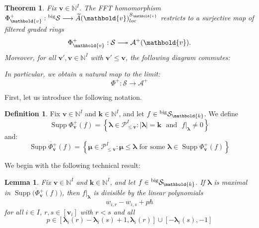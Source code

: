 \documentclass[11pt,reqno]{amsart}
\renewcommand{\mathbf}{\mathbold}
\numberwithin{equation}{section}
\newtheorem{Theorem}[equation]{Theorem}
\newtheorem{Lemma}[equation]{Lemma}
\theoremstyle{definition}
\newtheorem{Definition}[equation]{Definition}
\newcommand{\cA}{\mathcal{A}}
\newcommand{\cP}{\mathcal{P}}
\newcommand{\cS}{\mathcal{S}}
\newcommand{\bk}{\mathbf{k}}
\newcommand{\bv}{\mathbf{v}}
\newcommand{\NN}{\mathbb{N}}
\renewcommand{\tilde}[1]{\widetilde{#1}}
\newcommand{\leftexp}[2]{\vphantom{#2}^{#1} #2}
\newcommand{\twoheadlongrightarrow}{\relbar\joinrel\twoheadrightarrow}
\DeclareMathOperator{\supp}{Supp}
\newcommand{\suchthat}{:}
\newcommand{\textand}{\text{ }\mathrm{and}\text{ }}
\renewcommand{\bv}{\mathbf{v}} %
\newcommand{\vertexset}{I}
\newcommand{\bla}{{\boldsymbol{\lambda}}}
\newcommand{\bmu}{{\boldsymbol{\mu}}}
\newcommand{\qzastplus}{\cA^{+}}
\newcommand{\GKLO}[1]{\tilde{A}(#1)_{loc}}
\newcommand{\preshu}{\leftexp{\mathrm{big}}{\cS}}
\begin{document}
\begin{Theorem}
  \label{thm:regularity-of-phi-bv}
  Fix $\bv \in \NN^I$. The FFT homomorphism $\Phi^+_\bv: \preshu \longrightarrow \GKLO{\bv}^{S_{\bv}}$ restricts to a surjective map of filtered graded rings
  \begin{equation}
    \label{eq:11}
   \Phi^+_\bv: \cS \twoheadlongrightarrow \qzastplus(\bv).
  \end{equation}
  Moreover, for all $\bv', \bv \in \NN^I$ with $\bv' \leq \bv$, the following diagram commutes: 
\begin{center}
\end{center}
In particular, we obtain a natural map to the limit:
\begin{equation}
  \label{eq:30}
  \Phi^+ : \cS \longrightarrow \qzastplus 
\end{equation}
\end{Theorem}

First, let us introduce the following notation.

\begin{Definition}
Fix $\bv \in \NN^I$ and $\bk \in \NN^I$, and let $f \in \preshu_{\bk}$. We define 
  \begin{equation}
    \label{eq:48}
    \supp{\Phi^+_{\bv}\left(f\right)} = \left\{ \bla \in \cP^\vertexset_{\leq \bv} \suchthat |\bla| = \bk \textand f\vert_{\bla} \neq 0   \right\}
  \end{equation}
  and:
  \begin{equation}
    \label{eq:49}
   \overline{\supp{\Phi^+_{\bv}\left(f\right)}} = \left\{ \bmu \in \cP^\vertexset_{\leq \bv} \suchthat \bmu \leq \bla \text{ for some } \bla \in \supp{\Phi^+_{\bv}\left(f\right)} \right\}
  \end{equation}
\end{Definition}



We begin with the following technical result:
\begin{Lemma}
  \label{lem:sl-2-divisibility}
  Fix $\bv \in \NN^I$ and $\bk \in \NN^I$, and let $f \in \preshu_{\bk}$. If $\bla$ is maximal in $\overline{\supp(\Phi^+_\bv(f)})$, then $f\vert_{\bla}$ is divisible by the linear polynomials
  \begin{equation}
    \label{eq:18}
    w_{i,r} - w_{i,s} + p \hbar
  \end{equation}
  for all $i \in I$, $r,s \in [\bv_i]$ with $r < s$ and all
  \begin{equation}
    \label{eq:19}
    p \in [\bla_i(r)-\bla_i(s) + 1,\bla_i(r)] \cup [-\bla_i(s), -1]
  \end{equation}
\end{Lemma}
\end{document}
